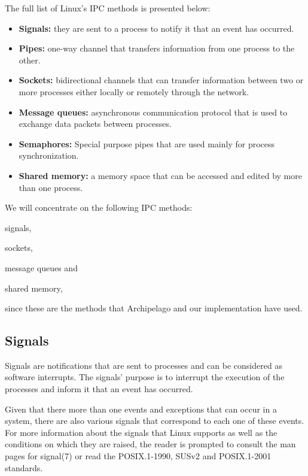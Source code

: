 The full list of Linux's IPC methods is presented below:

\begin{itemize}
	\item \textbf{Signals:} they are sent to a process to notify it that an 
		event has occurred.
	\item \textbf{Pipes:} one-way channel that transfers information from 
		one process to the other.
	\item \textbf{Sockets:} bidirectional channels that can transfer 
		information between two or more processes either locally or 
		remotely through the network.
	\item \textbf{Message queues:} asynchronous communication protocol that 
		is used to exchange data packets between processes.
	\item \textbf{Semaphores:} Special purpose pipes that are used mainly 
		for process synchronization.
	\item \textbf{Shared memory:} a memory space that can be accessed and 
		edited by more than one process.
\end{itemize}

We will concentrate on the following IPC methods:
\begin{inparaenum}[i)]
\item signals,
\item sockets,
\item message queues and
\item shared memory,
\end{inparaenum}
since these are the methods that Archipelago and our implementation have used.

\subsection{Signals}

Signals are notifications that are sent to processes and can be considered as 
software interrupts. The signals' purpose is to interrupt the execution of the 
processes and inform it that an event has occurred.

Given that there more than one events and exceptions that can occur in a 
system, there are also various signals that correspond to each one of these
events. For more information about the signals that Linux supports as well as 
the conditions on which they are raised, the reader is prompted to consult the 
man pages for signal(7) or read the POSIX.1-1990, SUSv2 and POSIX.1-2001 
standards.
  
